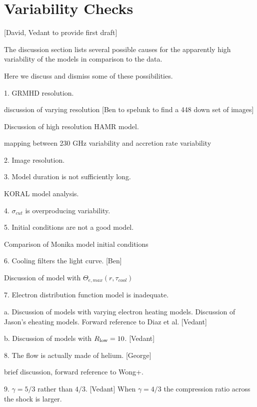 \section{Variability Checks}\label{app:variability}

[David, Vedant to provide first draft]

The discussion section lists several possible causes for the apparently high variability of the models in comparison to the data.

Here we discuss and dismiss some of these possibilities.

1. GRMHD resolution.

discussion of varying resolution [Ben to spelunk to find a 448 down set of images]

Discussion of high resolution HAMR model.

mapping between 230 GHz variability and accretion rate variability

2. Image resolution.

3. Model duration is not sufficiently long.

KORAL model analysis.

4. $\sigma_{cut}$ is overproducing variability.

5. Initial conditions are not a good model. 

Comparison of Monika model initial conditions

6. Cooling filters the light curve. [Ben]

Discussion of model with $\Theta_{e,max}(r, \tau_{cool})$

7. Electron distribution function model is inadequate. 

a.  Discussion of models with varying electron heating models.  Discussion of Jason's eheating models.   Forward reference to Diaz et al.  [Vedant]

b. Discussion of models with $R_\mathrm{low} = 10$. [Vedant]

8. The flow is actually made of helium. [George]

brief discussion, forward reference to Wong+.

9. $\gamma = 5/3$ rather than $4/3$.   [Vedant]  When $\gamma = 4/3$ the compression ratio across the shock is larger.

